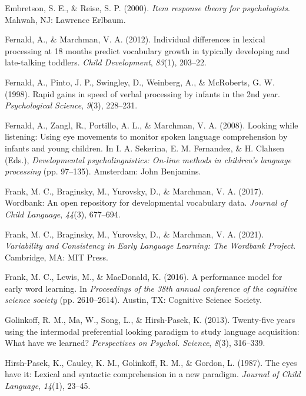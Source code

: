 \documentclass[10pt, letterpaper]{article}
\begin{document}
\leavevmode\hypertarget{ref-embretson2000}{}%
Embretson, S. E., \& Reise, S. P. (2000). \emph{Item response theory for
psychologists}. Mahwah, NJ: Lawrence Erlbaum.

\leavevmode\hypertarget{ref-Fernald2012a}{}%
Fernald, A., \& Marchman, V. A. (2012). Individual differences in
lexical processing at 18 months predict vocabulary growth in typically
developing and late-talking toddlers. \emph{Child Development},
\emph{83}(1), 203--22.

\leavevmode\hypertarget{ref-fernald1998}{}%
Fernald, A., Pinto, J. P., Swingley, D., Weinberg, A., \& McRoberts, G.
W. (1998). Rapid gains in speed of verbal processing by infants in the
2nd year. \emph{Psychological Science}, \emph{9}(3), 228--231.

\leavevmode\hypertarget{ref-Fernald2008}{}%
Fernald, A., Zangl, R., Portillo, A. L., \& Marchman, V. A. (2008).
Looking while listening: Using eye movements to monitor spoken language
comprehension by infants and young children. In I. A. Sekerina, E. M.
Fernandez, \& H. Clahsen (Eds.), \emph{Developmental psycholinguistics:
On-line methods in children's language processing} (pp. 97--135).
Amsterdam: John Benjamins.

\leavevmode\hypertarget{ref-Frank2016}{}%
Frank, M. C., Braginsky, M., Yurovsky, D., \& Marchman, V. A. (2017).
Wordbank: An open repository for developmental vocabulary data.
\emph{Journal of Child Language}, \emph{44}(3), 677--694.

\leavevmode\hypertarget{ref-frank2021}{}%
Frank, M. C., Braginsky, M., Yurovsky, D., \& Marchman, V. A. (2021).
\emph{Variability and Consistency in Early Language Learning: The
Wordbank Project}. Cambridge, MA: MIT Press.

\leavevmode\hypertarget{ref-frank2016b}{}%
Frank, M. C., Lewis, M., \& MacDonald, K. (2016). A performance model
for early word learning. In \emph{Proceedings of the 38th annual
conference of the cognitive science society} (pp. 2610--2614). Austin,
TX: Cognitive Science Society.

\leavevmode\hypertarget{ref-Golinkoff2013}{}%
Golinkoff, R. M., Ma, W., Song, L., \& Hirsh-Pasek, K. (2013).
Twenty-five years using the intermodal preferential looking paradigm to
study language acquisition: What have we learned? \emph{Perspectives on
Psychol. Science}, \emph{8}(3), 316--339.

\leavevmode\hypertarget{ref-Hirsh-Pasek1987}{}%
Hirsh-Pasek, K., Cauley, K. M., Golinkoff, R. M., \& Gordon, L. (1987).
The eyes have it: Lexical and syntactic comprehension in a new paradigm.
\emph{Journal of Child Language}, \emph{14}(1), 23--45.
\end{document}
